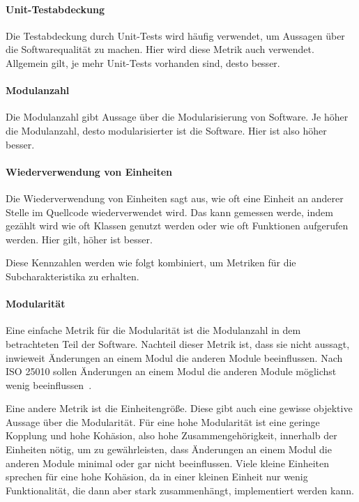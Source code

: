\documentclass[12pt, a4paper, ngerman]{article}
\begin{document}
\paragraph{Unit-Testabdeckung}

Die Testabdeckung durch Unit-Tests wird häufig verwendet,
um Aussagen über die Softwarequalität zu machen.
Hier wird diese Metrik auch verwendet.
Allgemein gilt, je mehr Unit-Tests vorhanden sind, desto besser.

\paragraph{Modulanzahl}

Die Modulanzahl gibt Aussage über die Modularisierung von Software.
Je höher die Modulanzahl, desto modularisierter ist die Software.
Hier ist also höher besser.

\paragraph{Wiederverwendung von Einheiten}

Die Wiederverwendung von Einheiten sagt aus,
wie oft eine Einheit an anderer Stelle im Quellcode wiederverwendet wird.
Das kann gemessen werde, indem gezählt wird wie oft Klassen genutzt werden
oder wie oft Funktionen aufgerufen werden.
Hier gilt, höher ist besser.

Diese Kennzahlen werden wie folgt kombiniert,
um Metriken für die Subcharakteristika zu erhalten.

\paragraph{Modularität}

Eine einfache Metrik für die Modularität ist die Modulanzahl
in dem betrachteten Teil der Software.
Nachteil dieser Metrik ist, dass sie nicht aussagt,
inwieweit Änderungen an einem Modul die anderen Module beeinflussen.
Nach ISO 25010 sollen Änderungen an einem Modul
die anderen Module möglichst wenig beeinflussen~\cite{ISO25010}.

Eine andere Metrik ist die Einheitengröße.
Diese gibt auch eine gewisse objektive Aussage über die Modularität.
Für eine hohe Modularität ist eine geringe Kopplung und
hohe Kohäsion, also hohe Zusammengehörigkeit, innerhalb der Einheiten nötig, um zu gewährleisten,
dass Änderungen an einem Modul die anderen Module minimal oder gar nicht beeinflussen.
Viele kleine Einheiten sprechen für eine hohe Kohäsion,
da in einer kleinen Einheit nur wenig Funktionalität,
die dann aber stark zusammenhängt, implementiert werden kann.
\end{document}
